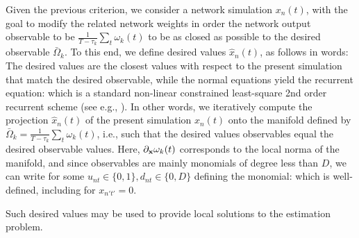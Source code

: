 Given the previous criterion, we consider a network simulation $x_n(t)$, with the goal to modify the related network weights in order the network output observable to be $\frac{1}{T-\tau_k} \sum_t \omega_k(t)$ to be as closed as possible to the desired observable $\bar{\Omega}_k$. To this end, we define desired values $\hat{x}_n(t)$, as follows
in words: The desired values are the closest values with respect to the present simulation that match the desired observable, while the normal equations yield the recurrent equation:
which is a standard non-linear constrained least-square 2nd order recurrent scheme (see e.g., \cite{vieville:inria-00074888}). In other words, we iteratively compute the projection $\hat{x}_n(t)$ of the present simulation $x_n(t)$ onto the manifold defined by $\bar{\Omega}_{k} = \frac{1}{T-\tau_k} \sum_t \omega_k(t)$, i.e., such that the desired values observables equal the desired observable values. Here, $\partial_{\bf x} \omega_{k}(t)$ corresponds to the local norma of the manifold, and since observables are mainly monomials of degree less than $D$, we can write for some $u_{nt} \in \{0, 1\}, d_{nt} \in \{0, D\}$ defining the monomial:
which is well-defined, including for $x_{n't'} = 0$.

Such desired values may be used to provide local solutions to the estimation problem.


